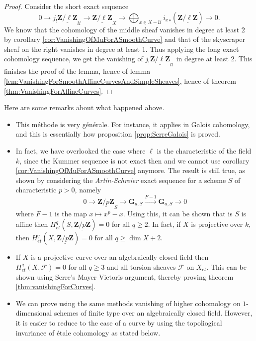\begin{proof}
Consider the short exact sequence
$$
0 \longrightarrow j_!\underline{\mathbf{Z}/\ell\mathbf{Z}}_\mathcal{U} 
\longrightarrow \underline{\mathbf{Z}/\ell\mathbf{Z}}_X \longrightarrow 
\bigoplus_{x \in X-\mathcal{U}} {i_x}_*(\underline{\mathbf{Z}/\ell\mathbf{Z}}) 
\longrightarrow 0.
$$
We know that the cohomology of the middle sheaf vanishes in degree at least 2 
by corollary \ref{cor:VanishingOfMuForASmoothCurve} and that of the skyscraper 
sheaf on the right vanishes in degree at least 1. Thus applying the long exact 
cohomology sequence, we get the vanishing of 
$j_!\underline{\mathbf{Z}/\ell\mathbf{Z}}_\mathcal{U}$ in degree at least 2. 
This finishes the proof of the lemma, hence of lemma 
\ref{lem:VanishingForSmoothAffineCurvesAndSimpleSheaves}, hence of theorem 
\ref{thm:VanishingForAffineCurves}.
\end{proof}


\begin{remark}
Here are some remarks about what happened above.
\begin{itemize}
\item 
This m\'ethode is very g\'en\'erale. For instance, it applies in Galois 
cohomology, and this is essentially how proposition \ref{prop:SerreGalois} is 
proved.
\item
In fact, we have overlooked the case where $\ell$ is the characteristic of the 
field $k$, since the Kummer sequence is not exact then and we cannot use 
corollary \ref{cor:VanishingOfMuForASmoothCurve} anymore. The result is still 
true, as shown by considering the {\it Artin-Schreier} exact sequence for a 
scheme $S$ of characteristic $p >0$, namely
$$
0 \longrightarrow \underline{\mathbf{Z}/p\mathbf{Z}}_S \longrightarrow 
\mathbf{G}_{a,S} \xrightarrow{F-1} \mathbf{G}_{a,S} \longrightarrow 0
$$
where $F-1$ is the map $x \mapsto x^p - x$. Using this, it can be shown that is 
$S$ is affine then $H_{et}^q(S,\underline{\mathbf{Z}/p\mathbf{Z}}) = 0$ for all 
$q \geq 2$. In fact, if $X$ is projective over $k$, then 
$H_{et}^q(X,\underline{\mathbf{Z}/p\mathbf{Z}}) = 0$ for all $q \geq \dim X+2$.
\item
If $X$ is a projective curve over an algebraically closed field then 
$H_{et}^q(X,\mathcal{F}) = 0$ for all $q \geq 3$ and all torsion sheaves 
$\mathcal{F}$ on $X_{et}$. This can be shown using Serre's Mayer Vietoris 
argument, thereby proving theorem \ref{thm:vanishingForCurves}.
\item We can prove using the same methods vanishing of higher cohomology
on $1$-dimensional schemes of finite type over an algebraically closed field.
However, it is easier to reduce to the case of a curve by using the
topoliogical invariance of \'etale cohomology as stated below.
\end{itemize}
\end{remark}

